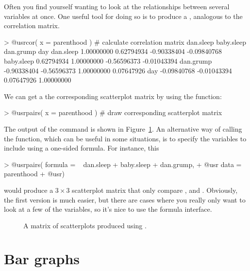 Often you find yourself wanting to look at the relationships between several variables at once. One useful tool for doing so is to produce a , analogous to the correlation matrix. 
\begin{rblock1}
> @usr{cor( x = parenthood )} # calculate correlation matrix
             dan.sleep  baby.sleep   dan.grump         day
dan.sleep   1.00000000  0.62794934 -0.90338404 -0.09840768
baby.sleep  0.62794934  1.00000000 -0.56596373 -0.01043394
dan.grump  -0.90338404 -0.56596373  1.00000000  0.07647926
day        -0.09840768 -0.01043394  0.07647926  1.00000000
\end{rblock1}
We can get a the corresponding scatterplot matrix by using the  function:
\begin{rblock1}
> @usr{pairs( x = parenthood )} # draw corresponding scatterplot matrix  
\end{rblock1}
The output of the  command is shown in Figure~\ref{fig:pairs}.  An alternative way of calling the  function, which can be useful in some situations, is to specify the variables to include using a one-sided formula. For instance, this
\begin{rblock1}
> @usr{pairs( formula = ~ dan.sleep + baby.sleep + dan.grump,}
+ @usr{       data = parenthood}
+ @usr{)}
\end{rblock1}
would produce a $3 \times 3$ scatterplot matrix that only compare ,  and . Obviously, the first version is much easier, but there are cases where you really only want to look at a few of the variables, so it's nice to use the formula interface.


\begin{figure}
\begin{center}
\caption{A matrix of scatterplots produced using .}
\HR
\label{fig:pairs}
\end{center}
\end{figure}



\section{Bar graphs\label{sec:bargraph}}

